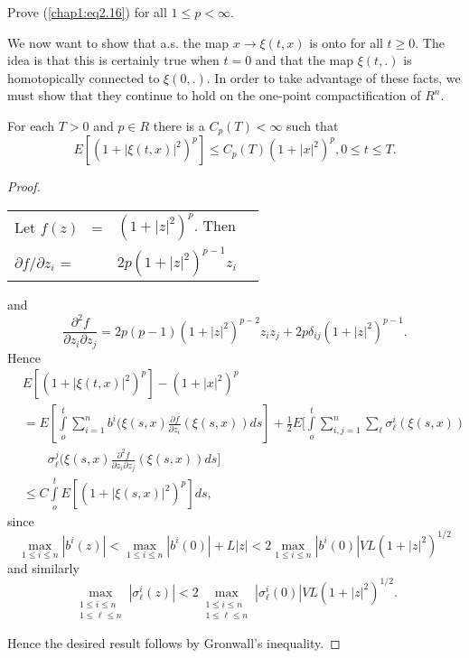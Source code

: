 \setcounter{exercise}{16}
\begin{exercise}%
Prove (\ref{chap1:eq2.16}) for all $1 \le p < \infty$.

We now want to show that a.s. the map $x \to \xi (t,x)$ is onto for
all $t \ge 0$. The idea is that this is certainly true when $t=0$ and
that the map $\xi (t,.)$ is homotopically connected to $\xi (0,.)$. In
order to take advantage of these facts, we must show that they
continue to hold on the one-point compactification of $R^n$. 
\end{exercise}

\setcounter{lemma}{17}
\begin{lemma}\label{chap1:lem2.18} %
For each $T>0$ and $p \in R$ there is a $C_p(T)<\infty$ such that 
$$
E [(1+ |\xi (t,x)|^2)^p] \le C_p (T) (1+|x|^2)^p,0 \le t \le T.
$$
\end{lemma}

\begin{proof}
\begin{tabular}[t]{lll}
 Let \quad $f(z)$ \, = &  $(1+|z|^2)^p$. \; Then \\[5pt]
\qquad $\partial f/ \partial z_i$  = &  $2p (1+|z|^2)^{p-1}z_i$
\end{tabular}

\noindent
and 
$$
\frac{\partial^2 f}{\partial z_i \partial z_j}=
2p(p-1)(1+|z|^2)^{p-2} z_i z_j +2p \delta_{ij} (1+|z|^2)^{p-1}. 
$$
Hence
\begin{align*}
& E[(1+|\xi(t,x)|^2)^p]- (1+|x|^2)^p\\
& =E [\int \limits^t_o \sum^n_{i=1} b^i (\xi(s,x) \frac{\partial f}{\partial
    z_i} (\xi (s,x))ds]+ \frac {1}{2} E [\int \limits^t_{o}
    \sum^n_{i,j=1} \sum_\ell \sigma^i_\ell (\xi (s,x))\\ 
& \qquad  \sigma^j_\ell (\xi
  (s,x) \frac{\partial^2 f}{\partial z_i \partial z_j}(\xi (s,x))ds]
  \\
& \le C \int\limits^t_o E [(1+ |\xi (s,x)|^2)^p]ds,
\end{align*}
since\pageoriginale
$$
\max_{1 \le i \le n} |b^i(z)|<\max_{1 \le i \le n} |b^i (0)|+L|z| <
2 \max_{1 \le i \le n} |b^i(0)|VL(1+|z|^2)^{1/2} 
$$
and similarly
$$
\max_{\substack {1 \le i \le n \\{1 \le \ell \leq n}}} |\sigma ^i_\ell
(z)| < 2 \max_{\substack {1 \le i \le n \\{1 \le \ell \leq n}}}|\sigma ^i_
\ell (0)|VL(1+ |z|^2)^{1/2}. 
$$

Hence the desired result follows by Gronwall's inequality.
\end{proof}


